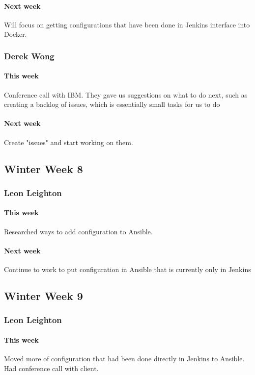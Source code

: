 \documentclass[10pt,letterpaper,onecolumn,draftclsnofoot]{IEEEtran}
\begin{document}
\paragraph{Next week}Will focus on getting configurations that have been done in Jenkins interface into Docker.

\subsubsection{Derek Wong}
\paragraph{This week}Conference call with IBM. They gave us suggestions on what to do next, such as creating a backlog of issues, which is essentially small tasks for us to do
\paragraph{Next week}Create "issues" and start working on them.


\subsection{Winter Week 8}
\subsubsection{Leon Leighton}
\paragraph{This week}Researched ways to add configuration to Ansible.
\paragraph{Next week}Continue to work to put configuration in Ansible that is currently only in Jenkins


\subsection{Winter Week 9}
\subsubsection{Leon Leighton}
\paragraph{This week}Moved more of configuration that had been done directly in Jenkins to Ansible.  
Had conference call with client.
\end{document}
